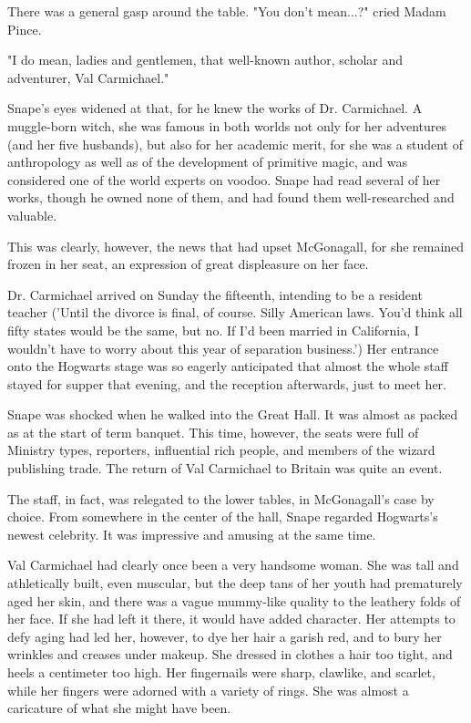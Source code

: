\documentclass[a4paper,11pt]{article}
\begin{document}
There was a general gasp around the table. "You don't mean...?" cried Madam Pince.

"I do mean, ladies and gentlemen, that well-known author, scholar and adventurer, Val Carmichael."

Snape's eyes widened at that, for he knew the works of Dr. Carmichael. A muggle-born witch, she was famous in both worlds not only for her adventures (and her five husbands), but also for her academic merit, for she was a student of anthropology as well as of the development of primitive magic, and was considered one of the world experts on voodoo. Snape had read several of her works, though he owned none of them, and had found them well-researched and valuable.

This was clearly, however, the news that had upset McGonagall, for she remained frozen in her seat, an expression of great displeasure on her face.

Dr. Carmichael arrived on Sunday the fifteenth, intending to be a resident teacher ('Until the divorce is final, of course. Silly American laws. You'd think all fifty states would be the same, but no. If I'd been married in California, I wouldn't have to worry about this year of separation business.') Her entrance onto the Hogwarts stage was so eagerly anticipated that almost the whole staff stayed for supper that evening, and the reception afterwards, just to meet her.

Snape was shocked when he walked into the Great Hall. It was almost as packed as at the start of term banquet. This time, however, the seats were full of Ministry types, reporters, influential rich people, and members of the wizard publishing trade. The return of Val Carmichael to Britain was quite an event.

The staff, in fact, was relegated to the lower tables, in McGonagall's case by choice. From somewhere in the center of the hall, Snape regarded Hogwarts's newest celebrity. It was impressive and amusing at the same time.

Val Carmichael had clearly once been a very handsome woman. She was tall and athletically built, even muscular, but the deep tans of her youth had prematurely aged her skin, and there was a vague mummy-like quality to the leathery folds of her face. If she had left it there, it would have added character. Her attempts to defy aging had led her, however, to dye her hair a garish red, and to bury her wrinkles and creases under makeup. She dressed in clothes a hair too tight, and heels a centimeter too high. Her fingernails were sharp, clawlike, and scarlet, while her fingers were adorned with a variety of rings. She was almost a caricature of what she might have been.
\end{document}
